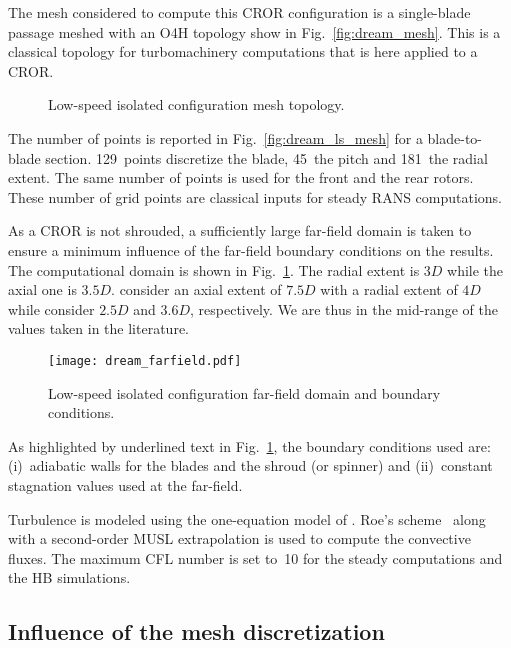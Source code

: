 
The mesh considered to compute this
CROR configuration is a single-blade passage meshed
with an O4H topology show in Fig.~\ref{fig:dream_mesh}. This is a classical
topology for turbomachinery computations that is here applied to 
a CROR.
\begin{figure}[htb]
  \centering
  \caption{Low-speed isolated configuration mesh topology.}
\end{figure}
The number of points is reported in 
Fig.~\ref{fig:dream_ls_mesh} for a blade-to-blade section. 
129~points discretize the blade, 45~the pitch and 181~the radial
extent. The same number of points is used for the front
and the rear rotors. These number of grid points are
classical inputs for steady RANS computations.

As a CROR is not shrouded, a sufficiently large
far-field domain is taken to ensure a minimum influence
of the far-field boundary conditions on the results.
The computational domain is shown in Fig.~\ref{fig:dream_farfield}.
The radial extent is $3D$ while the axial one is $3.5D$.
\citet{Peters2012} consider an axial extent of $7.5D$
with a radial extent of $4D$ while \citet{Zachariadis2011}
consider $2.5D$ and $3.6D$, respectively. We are thus in 
the mid-range of the values taken in the literature.
\begin{figure}[htb]
  \centering
  \texttt{[image: dream\_farfield.pdf]}
  \caption{Low-speed isolated configuration far-field domain and boundary conditions.}
  \label{fig:dream_farfield}
\end{figure}

As highlighted by underlined text in Fig.~\ref{fig:dream_farfield},
the boundary conditions used are: (i)~adiabatic walls
for the blades and the shroud (or spinner) and (ii)~constant
stagnation values used at the far-field.

Turbulence is modeled using the one-equation model of
\citet{Spalart1992}.  Roe's scheme~\cite{Roe1981} along with a 
second-order MUSL extrapolation 
is used to compute the convective fluxes.
The maximum CFL number is set to~10 for the steady 
computations and the HB simulations.

\subsection{Influence of the mesh discretization}
\label{sub:dream_ls_mesh_discretization}


